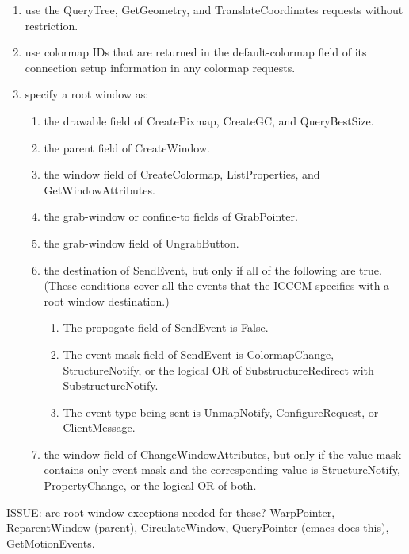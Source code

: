 \begin{enumerate}

\item use the QueryTree, GetGeometry, and TranslateCoordinates requests
without restriction.
\item use colormap IDs that are returned in the default-colormap
field of its connection setup information in any colormap requests.
\item specify a root window as:

\begin{enumerate}

\item the drawable field of CreatePixmap, CreateGC, and QueryBestSize.
\item the parent field of CreateWindow.
\item the window field of CreateColormap, ListProperties, and GetWindowAttributes.
\item the grab-window or confine-to fields of GrabPointer.
\item the grab-window field of UngrabButton.
\item the destination of SendEvent, but only if all of the following
are true.  (These conditions cover all the events that the ICCCM
specifies with a root window destination.)

\begin{enumerate}

\item The propogate field of SendEvent is False.
\item The event-mask field of SendEvent is ColormapChange,
StructureNotify, or the logical OR of SubstructureRedirect with
SubstructureNotify.
\item The event type being sent is UnmapNotify, ConfigureRequest,
or ClientMessage.

\end{enumerate}

\item the window field of ChangeWindowAttributes, but only if
the value-mask contains only event-mask and the corresponding value
is StructureNotify, PropertyChange, or the logical OR of both.

\end{enumerate}
\end{enumerate}

ISSUE: are root window exceptions needed for these?  WarpPointer,
ReparentWindow (parent), CirculateWindow, QueryPointer (emacs does
this), GetMotionEvents.

